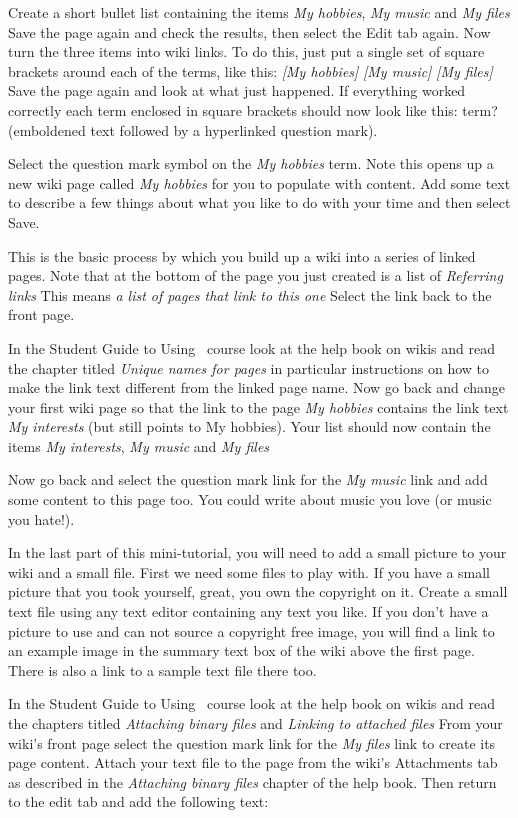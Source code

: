 Create a short bullet list containing the items \emph{My hobbies},  \emph{My music}  and \emph{My files}  Save the page again and check the results, then select the Edit tab again. Now turn the three items into wiki links. To do this, just put a single set of square brackets around each of the terms, like this: \emph{[My hobbies]}  \emph{[My music]}  \emph{[My files]}  Save the page again and look at what just happened. If everything worked correctly each term enclosed in square brackets should now look like this: term? (emboldened text followed by a hyperlinked question mark).

Select the question mark symbol on the \emph{My hobbies} term. Note this opens up a new wiki page called \emph{My hobbies} for you to populate with content. Add some text to describe a few things about what you like to do with your time and then select Save.

This is the basic process by which you build up a wiki into a series of linked pages. Note that at the bottom of the page you just created is a list of \emph{Referring links}  This means \emph{a list of pages that link to this one}  Select the link back to the front page.

In the Student Guide to Using \moodle\ course look at the help book on wikis and read the chapter titled \emph{Unique names for pages}  in particular instructions on how to make the link text different from the linked page name. Now go back and change your first wiki page so that the link to the page \emph{My hobbies} contains the link text \emph{My interests} (but still points to My hobbies). Your list should now contain the items \emph{My interests},  \emph{My music}  and \emph{My files} 

Now go back and select the question mark link for the \emph{My music} link and add some content to this page too. You could write about music you love (or music you hate!).

In the last part of this mini-tutorial, you will need to add a small picture to your wiki and a small file. First we need some files to play with. If you have a small picture that you took yourself, great, you own the copyright on it. Create a small text file using any text editor containing any text you like. If you don't have a picture to use and can not source a copyright free image, you will find a link to an example image in the summary text box of the wiki above the first page. There is also a link to a sample text file there too.

In the Student Guide to Using \moodle\ course look at the help book on wikis and read the chapters titled \emph{Attaching binary files} and \emph{Linking to attached files}  From your wiki's front page select the question mark link for the \emph{My files} link to create its page content. Attach your text file to the page from the wiki's Attachments tab as described in the \emph{Attaching binary files} chapter of the help book. Then return to the edit tab and add the following text:

